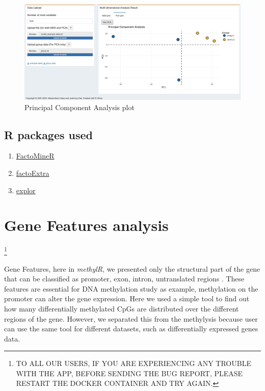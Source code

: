 \documentclass[
  a4paper,
  oneside,
  open=any]{scrreport}
\providecommand{\tightlist}{%
  \setlength{\itemsep}{0pt}\setlength{\parskip}{0pt}}\usepackage{longtable,booktabs,array}
\begin{document}
\begin{figure}[H]

{\centering \includegraphics{./_images/PCA.png}

}

\caption{Principal Component Analysis plot}

\end{figure}

\hypertarget{r-packages-used}{%
\section{R packages used}\label{r-packages-used}}

\begin{enumerate}
\def\labelenumi{\arabic{enumi}.}
\tightlist
\item
  \href{https://cran.r-project.org/web/packages/FactoMineR/FactoMineR.pdf}{FactoMineR}
\item
  \href{https://cran.r-project.org/web/packages/factoextra/factoextra.pdf}{factoExtra}
\item
  \href{https://cran.r-project.org/web/packages/explor/explor.pdf}{explor}
\end{enumerate}

\hypertarget{sec-genfeatures}{%
\chapter{Gene Features analysis}\label{sec-genfeatures}}

\footnote{TO ALL OUR USERS, IF YOU ARE EXPERIENCING ANY TROUBLE WITH THE
  APP, BEFORE SENDING THE BUG REPORT, PLEASE RESTART THE DOCKER
  CONTAINER AND TRY AGAIN.}

Gene Features, here in \emph{methylR}, we presented only the structural
part of the gene that can be classified as promoter, exon, intron,
untranslated regions \autocite{skolnick2000structural}. These features
are essential for DNA methylation study as example, methylation on the
promoter can alter the gene expression. Here we used a simple tool to
find out how many differentially methylated CpGs are distributed over
the different regions of the gene. However, we separated this from the
methylysis because user can use the same tool for different datasets,
such as differentially expressed genes data.
\end{document}
